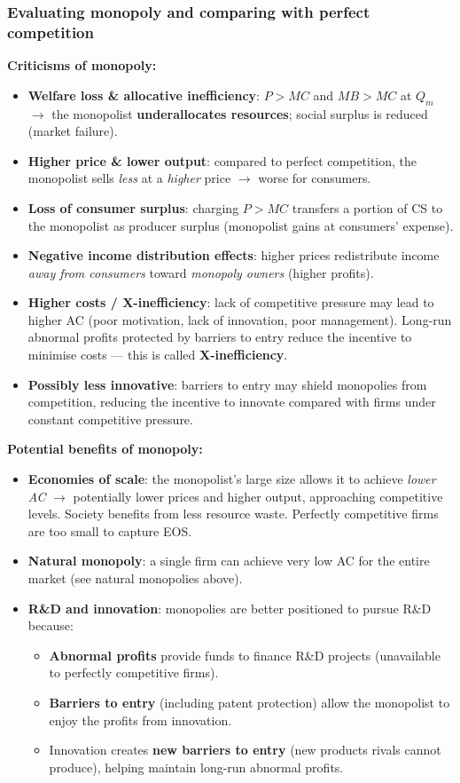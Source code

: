 \documentclass[a4paper,12pt]{article}
\begin{document}
\subsubsection*{Evaluating monopoly and comparing with perfect competition}
\textbf{Criticisms of monopoly:}
\begin{itemize}
  \item \textbf{Welfare loss \& allocative inefficiency}: $P > MC$ and $MB > MC$ at $Q_m$ $\to$ the monopolist \textbf{underallocates resources}; social surplus is reduced (market failure).
  \item \textbf{Higher price \& lower output}: compared to perfect competition, the monopolist sells \textit{less} at a \textit{higher} price $\to$ worse for consumers.
  \item \textbf{Loss of consumer surplus}: charging $P > MC$ transfers a portion of CS to the monopolist as producer surplus (monopolist gains at consumers' expense).
  \item \textbf{Negative income distribution effects}: higher prices redistribute income \textit{away from consumers} toward \textit{monopoly owners} (higher profits).
  \item \textbf{Higher costs / X-inefficiency}: lack of competitive pressure may lead to higher AC (poor motivation, lack of innovation, poor management). Long-run abnormal profits protected by barriers to entry reduce the incentive to minimise costs --- this is called \textbf{X-inefficiency}.
  \item \textbf{Possibly less innovative}: barriers to entry may shield monopolies from competition, reducing the incentive to innovate compared with firms under constant competitive pressure.
\end{itemize}
\textbf{Potential benefits of monopoly:}
\begin{itemize}
  \item \textbf{Economies of scale}: the monopolist's large size allows it to achieve \textit{lower AC} $\to$ potentially lower prices and higher output, approaching competitive levels. Society benefits from less resource waste. Perfectly competitive firms are too small to capture EOS.
  \item \textbf{Natural monopoly}: a single firm can achieve very low AC for the entire market (see natural monopolies above).
  \item \textbf{R\&D and innovation}: monopolies are better positioned to pursue R\&D because:
  \begin{itemize}
    \item \textbf{Abnormal profits} provide funds to finance R\&D projects (unavailable to perfectly competitive firms).
    \item \textbf{Barriers to entry} (including patent protection) allow the monopolist to enjoy the profits from innovation.
    \item Innovation creates \textbf{new barriers to entry} (new products rivals cannot produce), helping maintain long-run abnormal profits.
  \end{itemize}
\end{itemize}
\end{document}
